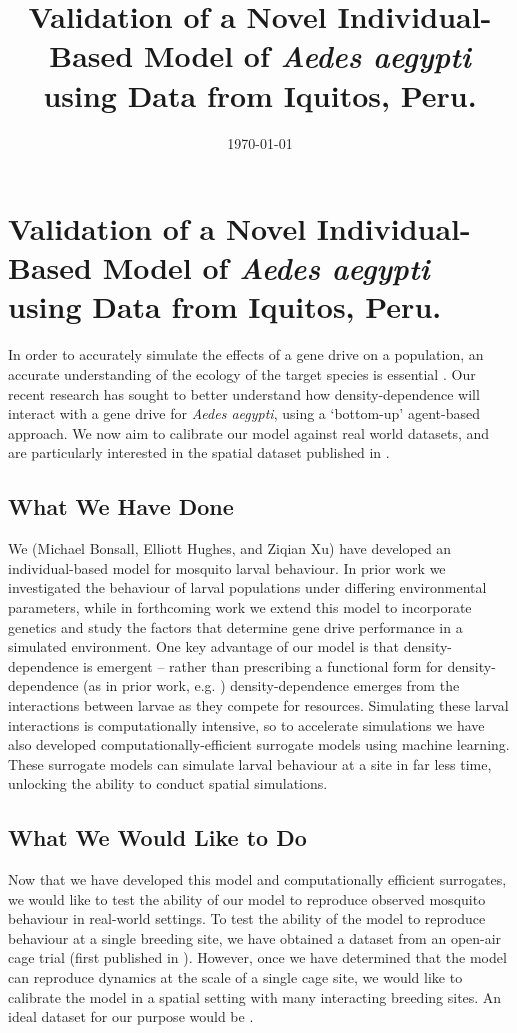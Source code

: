 \documentclass{article}
\title{Validation of a Novel Individual-Based Model of \emph{Aedes aegypti} using Data from Iquitos, Peru.}
\date{\today}
\begin{document}
\section*{Validation of a Novel Individual-Based Model of \emph{Aedes aegypti} using Data from Iquitos, Peru.}

In order to accurately simulate the effects of a gene drive on a population, an accurate understanding of the ecology of the target species is essential \cite{kim2023incorporating}. Our recent research has sought to better understand how density-dependence will interact with a gene drive for \emph{Aedes aegypti}, using a `bottom-up' agent-based approach. We now aim to calibrate our model against real world datasets, and are particularly interested in the spatial dataset published in \cite{gunning2022critical}.

\subsection*{What We Have Done}
We (Michael Bonsall, Elliott Hughes, and Ziqian Xu) have developed an individual-based model for mosquito larval behaviour. In prior work \cite{xu2026emergent} we investigated the behaviour of larval populations under differing environmental parameters, while in forthcoming work we extend this model to incorporate genetics and study the factors that determine gene drive performance in a simulated environment. One key advantage of our model is that density-dependence is emergent -- rather than prescribing a functional form for density-dependence (as in prior work, e.g.\! \cite{magori2009skeeter,otero2008stochastic}) density-dependence emerges from the interactions between larvae as they compete for resources. Simulating these larval interactions is computationally intensive, so to accelerate simulations we have also developed computationally-efficient surrogate models using machine learning. These surrogate models can simulate larval behaviour at a site in far less time, unlocking the ability to conduct spatial simulations. 

\subsection*{What We Would Like to Do}
Now that we have developed this model and computationally efficient surrogates, we would like to test the ability of our model to reproduce observed mosquito behaviour in real-world settings. To test the ability of the model to reproduce behaviour at a single breeding site, we have obtained a dataset from an open-air cage trial (first published in \cite{hancock2016predicting}). However, once we have determined that the model can reproduce dynamics at the scale of a single cage site, we would like to calibrate the model in a spatial setting with many interacting breeding sites. An ideal dataset for our purpose would be \cite{gunning2022critical}.
\end{document}
